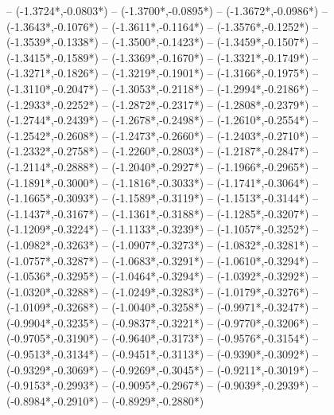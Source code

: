 {	-- ({-1.3724*\dx},{-0.0803*\dy})
	-- ({-1.3700*\dx},{-0.0895*\dy})
	-- ({-1.3672*\dx},{-0.0986*\dy})
	-- ({-1.3643*\dx},{-0.1076*\dy})
	-- ({-1.3611*\dx},{-0.1164*\dy})
	-- ({-1.3576*\dx},{-0.1252*\dy})
	-- ({-1.3539*\dx},{-0.1338*\dy})
	-- ({-1.3500*\dx},{-0.1423*\dy})
	-- ({-1.3459*\dx},{-0.1507*\dy})
	-- ({-1.3415*\dx},{-0.1589*\dy})
	-- ({-1.3369*\dx},{-0.1670*\dy})
	-- ({-1.3321*\dx},{-0.1749*\dy})
	-- ({-1.3271*\dx},{-0.1826*\dy})
	-- ({-1.3219*\dx},{-0.1901*\dy})
	-- ({-1.3166*\dx},{-0.1975*\dy})
	-- ({-1.3110*\dx},{-0.2047*\dy})
	-- ({-1.3053*\dx},{-0.2118*\dy})
	-- ({-1.2994*\dx},{-0.2186*\dy})
	-- ({-1.2933*\dx},{-0.2252*\dy})
	-- ({-1.2872*\dx},{-0.2317*\dy})
	-- ({-1.2808*\dx},{-0.2379*\dy})
	-- ({-1.2744*\dx},{-0.2439*\dy})
	-- ({-1.2678*\dx},{-0.2498*\dy})
	-- ({-1.2610*\dx},{-0.2554*\dy})
	-- ({-1.2542*\dx},{-0.2608*\dy})
	-- ({-1.2473*\dx},{-0.2660*\dy})
	-- ({-1.2403*\dx},{-0.2710*\dy})
	-- ({-1.2332*\dx},{-0.2758*\dy})
	-- ({-1.2260*\dx},{-0.2803*\dy})
	-- ({-1.2187*\dx},{-0.2847*\dy})
	-- ({-1.2114*\dx},{-0.2888*\dy})
	-- ({-1.2040*\dx},{-0.2927*\dy})
	-- ({-1.1966*\dx},{-0.2965*\dy})
	-- ({-1.1891*\dx},{-0.3000*\dy})
	-- ({-1.1816*\dx},{-0.3033*\dy})
	-- ({-1.1741*\dx},{-0.3064*\dy})
	-- ({-1.1665*\dx},{-0.3093*\dy})
	-- ({-1.1589*\dx},{-0.3119*\dy})
	-- ({-1.1513*\dx},{-0.3144*\dy})
	-- ({-1.1437*\dx},{-0.3167*\dy})
	-- ({-1.1361*\dx},{-0.3188*\dy})
	-- ({-1.1285*\dx},{-0.3207*\dy})
	-- ({-1.1209*\dx},{-0.3224*\dy})
	-- ({-1.1133*\dx},{-0.3239*\dy})
	-- ({-1.1057*\dx},{-0.3252*\dy})
	-- ({-1.0982*\dx},{-0.3263*\dy})
	-- ({-1.0907*\dx},{-0.3273*\dy})
	-- ({-1.0832*\dx},{-0.3281*\dy})
	-- ({-1.0757*\dx},{-0.3287*\dy})
	-- ({-1.0683*\dx},{-0.3291*\dy})
	-- ({-1.0610*\dx},{-0.3294*\dy})
	-- ({-1.0536*\dx},{-0.3295*\dy})
	-- ({-1.0464*\dx},{-0.3294*\dy})
	-- ({-1.0392*\dx},{-0.3292*\dy})
	-- ({-1.0320*\dx},{-0.3288*\dy})
	-- ({-1.0249*\dx},{-0.3283*\dy})
	-- ({-1.0179*\dx},{-0.3276*\dy})
	-- ({-1.0109*\dx},{-0.3268*\dy})
	-- ({-1.0040*\dx},{-0.3258*\dy})
	-- ({-0.9971*\dx},{-0.3247*\dy})
	-- ({-0.9904*\dx},{-0.3235*\dy})
	-- ({-0.9837*\dx},{-0.3221*\dy})
	-- ({-0.9770*\dx},{-0.3206*\dy})
	-- ({-0.9705*\dx},{-0.3190*\dy})
	-- ({-0.9640*\dx},{-0.3173*\dy})
	-- ({-0.9576*\dx},{-0.3154*\dy})
	-- ({-0.9513*\dx},{-0.3134*\dy})
	-- ({-0.9451*\dx},{-0.3113*\dy})
	-- ({-0.9390*\dx},{-0.3092*\dy})
	-- ({-0.9329*\dx},{-0.3069*\dy})
	-- ({-0.9269*\dx},{-0.3045*\dy})
	-- ({-0.9211*\dx},{-0.3019*\dy})
	-- ({-0.9153*\dx},{-0.2993*\dy})
	-- ({-0.9095*\dx},{-0.2967*\dy})
	-- ({-0.9039*\dx},{-0.2939*\dy})
	-- ({-0.8984*\dx},{-0.2910*\dy})
	-- ({-0.8929*\dx},{-0.2880*\dy})
}
